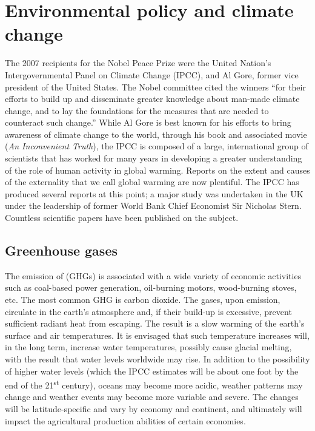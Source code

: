 \section{Environmental policy and climate change}\label{sec:ch5sec7}

The 2007 recipients for the Nobel Peace Prize were the United Nation's Intergovernmental Panel on Climate Change (IPCC), and Al Gore, former vice president of the United States. The Nobel committee cited the winners ``for their efforts to build up and disseminate greater knowledge about man-made climate change, and to lay the foundations for the measures that are needed to counteract such change.'' While Al Gore is best known for his efforts to bring awareness of climate change to the world, through his book and associated movie (\textit{An Inconvenient Truth}), the IPCC is composed of a large, international group of scientists that has worked for many years in developing a greater understanding of the role of human activity in global warming. Reports on the extent and causes of the externality that we call global warming are now plentiful. The IPCC has produced several reports at this point; a major study was undertaken in the UK under the leadership of former World Bank Chief Economist Sir Nicholas Stern. Countless scientific papers have been published on the subject.

\subsection*{Greenhouse gases}

The emission of  (GHGs) is associated with a wide variety of economic activities such as coal-based power generation, oil-burning motors, wood-burning stoves, etc. The most common GHG is carbon dioxide. The gases, upon emission, circulate in the earth's atmosphere and, if their build-up is excessive, prevent sufficient radiant heat from escaping. The result is a slow warming of the earth's surface and air temperatures. It is envisaged that such temperature increases will, in the long term, increase water temperatures, possibly cause glacial melting, with the result that water levels worldwide may rise. In addition to the possibility of higher water levels (which the IPCC estimates will be about one foot by the end of the 21\textsuperscript{st} century), oceans may become more acidic, weather patterns may change and weather events may become more variable and severe. The changes will be latitude-specific and vary by economy and continent, and ultimately will impact the agricultural production abilities of certain economies.

